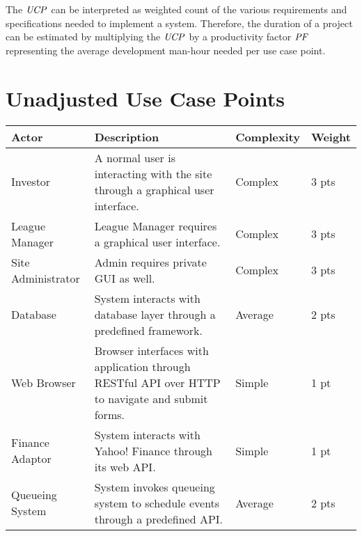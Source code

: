 The $\mathit{UCP}$ can be interpreted as weighted count of
the various requirements and specifications needed to implement a 
system. Therefore, the duration of a project can be estimated by
multiplying the $\mathit{UCP}$ by a productivity factor $\mathit{PF}$ representing
the average development man-hour needed per use case point.

\section{Unadjusted Use Case Points}

\renewcommand\arraystretch{2}
\begin{longtable}{|p{1in}|p{3.9in}|p{0.8in}|p{.5in}|}
\hline
{\large \color{color1}Actor}&{\large \color{color1}Description}&{\large \color{color1}Complexity}&{\large \color{color1}Weight} \\ \hline
Investor&A normal user is interacting with the site through a graphical user interface.&Complex &3 pts \\ \hline 
League Manager&League Manager requires a graphical user interface.&Complex &3 pts \\ \hline 
Site Administrator&Admin requires private GUI as well.&Complex &3 pts \\ \hline 
Database&System interacts with database layer through a predefined framework.&Average &2 pts \\ \hline 
Web Browser&Browser interfaces with application through RESTful API over HTTP to navigate and submit forms.&Simple &1 pt \\ \hline 
Finance Adaptor&System interacts with Yahoo! Finance through its web API.&Simple &1 pt \\ \hline 
Queueing System&System invokes queueing system to schedule events through a predefined API.&Average & 2 pts \\ \hline
\end{longtable}

